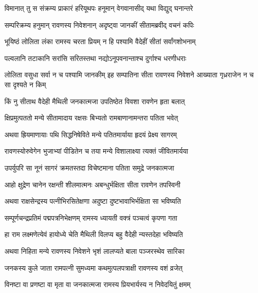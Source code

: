 
\twolineshloka
{विमानात् तु स संक्रम्य प्राकारं हरियूथपः}
{हनूमान् वेगवानासीद् यथा विद्युद् घनान्तरे} %

\twolineshloka
{सम्परिक्रम्य हनुमान् रावणस्य निवेशनान्}
{अदृष्ट्वा जानकीं सीतामब्रवीद् वचनं कपिः} %

\twolineshloka
{भूयिष्ठं लोलिता लंका रामस्य चरता प्रियम्}
{न हि पश्यामि वैदेहीं सीतां सर्वांगशोभनाम्} %

\twolineshloka
{पल्वलानि तटाकानि सरांसि सरितस्तथा}
{नद्योऽनूपवनान्ताश्च दुर्गाश्च धरणीधराः} %

\threelineshloka
{लोलिता वसुधा सर्वा न च पश्यामि जानकीम्}
{इह सम्पातिना सीता रावणस्य निवेशने}
{आख्याता गृध्रराजेन न च सा दृश्यते न किम्} %

\twolineshloka
{किं नु सीताथ वैदेही मैथिली जनकात्मजा}
{उपतिष्ठेत विवशा रावणेन हृता बलात्} %

\twolineshloka
{क्षिप्रमुत्पततो मन्ये सीतामादाय रक्षसः}
{बिभ्यतो रामबाणानामन्तरा पतिता भवेत्} %

\twolineshloka
{अथवा ह्रियमाणायाः पथि सिद्धनिषेविते}
{मन्ये पतितमार्याया हृदयं प्रेक्ष्य सागरम्} %

\twolineshloka
{रावणस्योरुवेगेन भुजाभ्यां पीडितेन च}
{तया मन्ये विशालाक्ष्या त्यक्तं जीवितमार्यया} %

\twolineshloka
{उपर्युपरि सा नूनं सागरं क्रमतस्तदा}
{विचेष्टमाना पतिता समुद्रे जनकात्मजा} %

\twolineshloka
{आहो क्षुद्रेण चानेन रक्षन्ती शीलमात्मनः}
{अबन्धुर्भक्षिता सीता रावणेन तपस्विनी} %

\twolineshloka
{अथवा राक्षसेन्द्रस्य पत्नीभिरसितेक्षणा}
{अदुष्टा दुष्टभावाभिर्भक्षिता सा भविष्यति} %

\twolineshloka
{सम्पूर्णचन्द्रप्रतिमं पद्मपत्रनिभेक्षणम्}
{रामस्य ध्यायती वक्त्रं पञ्चत्वं कृपणा गता} %

\twolineshloka
{हा राम लक्ष्मणेत्येवं हायोध्ये चेति मैथिली}
{विलप्य बहु वैदेही न्यस्तदेहा भविष्यति} %

\twolineshloka
{अथवा निहिता मन्ये रावणस्य निवेशने}
{भृशं लालप्यते बाला पञ्जरस्थेव सारिका} %

\twolineshloka
{जनकस्य कुले जाता रामपत्नी सुमध्यमा}
{कथमुत्पलपत्राक्षी रावणस्य वशं व्रजेत्} %

\twolineshloka
{विनष्टा वा प्रणष्टा वा मृता वा जनकात्मजा}
{रामस्य प्रियभार्यस्य न निवेदयितुं क्षमम्} %

